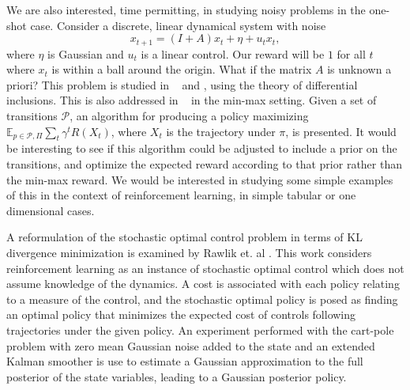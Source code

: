 \documentclass{article}
\begin{document}
We are also interested, time permitting, in studying noisy problems in the one-shot case. Consider a discrete, linear dynamical system with noise
\[
    x_{t+1} = (I + A) x_t + \eta + u_t x_t,
\]
where $\eta$ is Gaussian and $u_t$ is a linear control. Our reward will be $1$ for all $t$ where $x_t$ is within a ball around the origin. What if the matrix $A$ is unknown a priori? This problem is studied in ~\cite{ornikIsraelTopcu} and \cite{ahmadiIsraelTopcu}, using the theory of differential inclusions. This is also addressed in ~\cite{bagnellNgSchneider} in the min-max setting. Given a set of transitions $\mathcal P$, an algorithm for producing a policy maximizing $\mathbb E_{p \in \mathcal P, \Pi} \sum\limits_t \gamma^t R(X_t)$, where $X_t$ is the trajectory under $\pi$, is presented. It would be interesting to see if this algorithm could be adjusted to include a prior on the transitions, and optimize the expected reward according to that prior rather than the min-max reward. We would be interested in studying some simple examples of this in the context of reinforcement learning, in simple tabular or one dimensional cases. 



A reformulation of the stochastic optimal control problem in terms of KL divergence minimization is examined by Rawlik et. al \cite{rawlik2013stochastic}. This work considers reinforcement learning as an instance of stochastic optimal control which does not assume knowledge of the dynamics.  A cost is associated with each policy relating to a measure of the control, and the stochastic optimal policy is posed as finding an optimal policy that minimizes the expected cost of controls following trajectories under the given policy. An experiment performed with the cart-pole problem with zero mean Gaussian noise added to the state and an extended Kalman smoother \cite{stengel1986stochastic} is use to estimate a Gaussian approximation to the full posterior of the state variables, leading to a Gaussian posterior policy.
\iffalse
A specific instance of stochastic optimal control is the reinforcement learning (RL) formalism  which does not assume knowledge of the dynamics or cost function, a situation that may often arise in practice.  Let $\mathcal{C}_t(x, u) \ge 0$ be the cost incurred per stage for choosing control $u$ in state $x$ at time $t$. The SOC problem consists of finding a policy which minimises the expected cost, i.e., solving
\begin{equation}
    \pi^* = \underset{\pi}{\mathrm{argmin}} \left \langle i  \sum_{t=0}^T \mathcal{C}_t (x_t, u_t) \right \rangle_{q_{\pi}}
\end{equation}
where $\langle \cdot \rangle_{q_{\pi}}$ denotes the expectation with respect to the distribution over trajectories under policy $\pi$.
\fi

 

\end{document}
